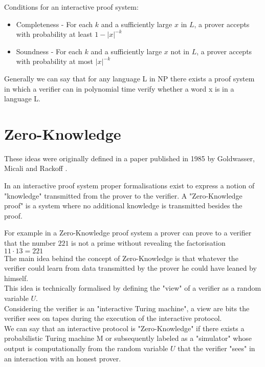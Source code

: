 \documentclass[12pt,a4paper]{article}
\begin{document}
Conditions for an interactive proof system:
\begin{itemize}
  \item Completeness - For each $k$ and a sufficiently large $x$ in $L$, a prover accepts with probability at least $1 - |x|^{-k}$ 
  \item Soundness - For each $k$ and a sufficiently large $x$ not in $L$, a prover accepts with   probability at most $|x|^{-k}$
\end{itemize}
Generally we can say that for any language L in NP there exists a proof system in which a verifier can in polynomial time verify whether a word x is in a language L.

\newpage
\section{Zero-Knowledge}
These ideas were originally defined in a paper published in 1985 by Goldwasser, Micali and Rackoff \cite{GMR}. 

In an interactive proof system proper formalisations exist to express a notion of "knowledge" transmitted from the prover to the verifier. A "Zero-Knowledge proof" is a system where no additional knowledge is transmitted besides the proof.

For example in a Zero-Knowledge proof system a prover can prove to a verifier that the number $221$ is not a prime without revealing the factorisation $11 \cdot 13 = 221$\\

The main idea behind the concept of Zero-Knowledge is that whatever the verifier could learn from data transmitted by the prover he could have leaned by himself.\\

This idea is technically formalised by defining the "view" of a verifier as a random variable $U$.\\Considering the verifier is an "interactive Turing machine", a view are bits the verifier sees on tapes during the execution of the interactive protocol.\\
We can say that an interactive protocol is "Zero-Knowledge" if there exists a probabilistic Turing machine M or subsequently labeled as a "simulator" whose output is computationally from the random variable $U$ that the verifier "sees" in an interaction with an honest prover.
\end{document}
